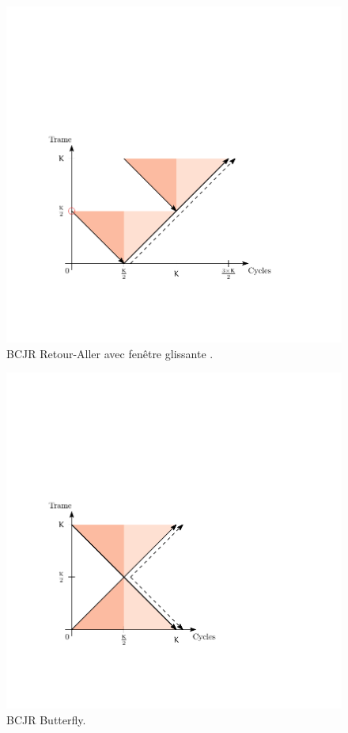 \begin{figure}[!h]
	\centering
	\includegraphics{main/ch4_fig/ipe/BF_SW.pdf}
	\caption{BCJR Retour-Aller avec fenêtre glissante . \label{fig:siso_sw}}
\end{figure}

\begin{figure}[h]
	\centering
	\includegraphics{main/ch4_fig/ipe/BFLY.pdf}
	\caption{BCJR Butterfly. \label{fig:siso_but}}
\end{figure}

